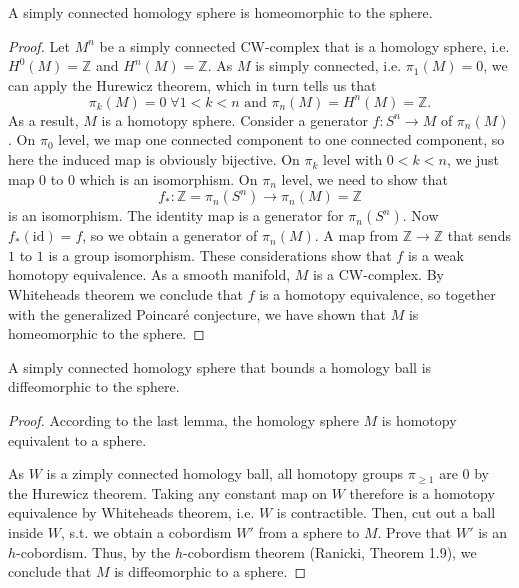 \begin{lemma}
    A simply connected homology sphere is homeomorphic to the sphere.
\end{lemma}
\begin{proof}
    Let $M^n$ be a simply connected CW-complex that is a homology sphere, i.e. $H^0(M) = \mathbb Z$ and $H^n(M) = \mathbb Z$. 
    As $M$ is simply connected, i.e. $\pi_1(M) = 0$, we can apply the Hurewicz theorem, which in turn tells us that
    \[
    \pi_k(M) = 0 \; \forall 1 < k < n\text{ and }\pi_n(M) = H^n(M) = \mathbb Z.
    \]
    As a result, $M$ is a homotopy sphere.
    Consider a generator $f: S^n \to M$ of $\pi_n(M)$.
    On $\pi_0$ level, we map one connected component to one connected component, so here the induced map is obviously bijective.
    On $\pi_k$ level with $0 < k < n$, we just map $0$ to $0$ which is an isomorphism.
    On $\pi_n$ level, we need to show that 
    \[
        f_*: \mathbb Z = \pi_n(S^n) \to \pi_n(M) = \mathbb Z 
    \]
    is an isomorphism. The identity map is a generator for $\pi_n(S^n)$. Now $f_*(\mathrm{id}) = f$, so we obtain a generator of $\pi_n(M)$. A map from $\mathbb Z \to \mathbb Z$ that sends $1$ to $1$ is a group isomorphism. These considerations show that $f$ is a weak homotopy equivalence.
    As a smooth manifold, $M$ is a CW-complex. By Whiteheads theorem we conclude that $f$ is a homotopy equivalence, so together with the generalized Poincar\'e conjecture, we have shown that $M$ is homeomorphic to the sphere.
\end{proof}

\begin{lemma}
    A simply connected homology sphere that bounds a homology ball is diffeomorphic to the sphere.
\end{lemma}
\begin{proof}
    According to the last lemma, the homology sphere $M$ is homotopy equivalent to a sphere.

    As $W$ is a zimply connected homology ball, all homotopy groups $\pi_{\ge 1}$ are 0 by the Hurewicz theorem.
    Taking any constant map on $W$ therefore is a homotopy equivalence by Whiteheads theorem, i.e. $W$ is contractible. 
    Then, cut out a ball inside $W$, s.t. we obtain a cobordism $W'$ from a sphere to $M$.
    Prove that $W'$ is an $h$-cobordism.
    Thus, by the $h$-cobordism theorem (Ranicki, Theorem 1.9), we conclude that
    $M$ is diffeomorphic to a sphere.
\end{proof}